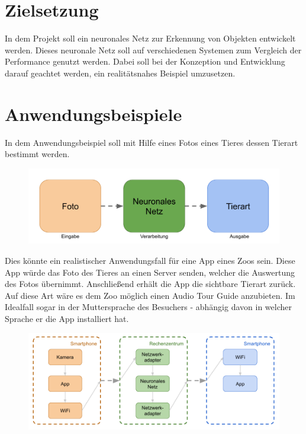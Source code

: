 

\section*{\LARGE\textbf{Zielsetzung}}

In dem Projekt soll ein neuronales Netz zur Erkennung von Objekten entwickelt werden. Dieses neuronale Netz soll auf verschiedenen Systemen zum Vergleich der Performance genutzt werden. Dabei soll bei der Konzeption und Entwicklung darauf geachtet werden, ein realitätsnahes Beispiel umzusetzen.



\section*{\LARGE\textbf{Anwendungsbeispiele}}

In dem Anwendungsbeispiel soll mit Hilfe eines Fotos eines Tieres dessen Tierart bestimmt werden. 

\begin{figure}[htbp]
	\centering
		\includegraphics[width=1.00\textwidth]{BilderPDF/zielsetzung/Prinzip.png}
	\label{fig:Prinzip}
\end{figure}

Dies könnte ein realistischer Anwendungsfall für eine App eines Zoos sein. Diese App würde das Foto des Tieres an einen Server senden, welcher die Auswertung des Fotos übernimmt. Anschließend erhält die App die sichtbare Tierart zurück. Auf diese Art wäre es dem Zoo  möglich einen Audio Tour Guide anzubieten. Im Idealfall sogar in der Muttersprache des Besuchers - abhängig davon in welcher Sprache er die App installiert hat. 

\begin{figure}[htbp]
	\centering
		\includegraphics[width=1.00\textwidth]{BilderPDF/zielsetzung/App.png}
	\label{fig:App}
\end{figure}

